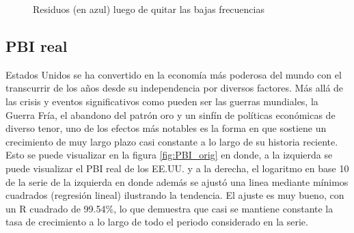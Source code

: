 \documentclass[a4paper]{article}
\begin{document}
\begin{figure}[H]
	\centering
	\caption{Residuos (en azul) luego de quitar las bajas frecuencias} 	
	\label{fig:cpi_cntr_antifft}
\end{figure}

\subsection{PBI real}
Estados Unidos se ha convertido en la economía más poderosa del mundo con el transcurrir de los años desde su independencia por diversos factores. Más allá de las crisis y eventos significativos como pueden ser las guerras mundiales, la Guerra Fría, el abandono del patrón oro y un sinfín de políticas económicas de diverso tenor, uno de los efectos más notables es la forma en que sostiene un crecimiento de muy largo plazo casi constante a lo largo de su historia reciente. Esto se puede visualizar en la figura \ref{fig:PBI_orig} en donde, a la izquierda se puede visualizar el PBI real de los EE.UU. y a la derecha, el logaritmo en base 10 de la serie de la izquierda en donde además se ajustó una linea mediante mínimos cuadrados (regresión lineal) ilustrando la tendencia. El ajuste es muy bueno, con un R cuadrado de 99.54\%, lo que demuestra que casi se mantiene constante la tasa de crecimiento a lo largo de todo el periodo considerado en la serie.
\end{document}

